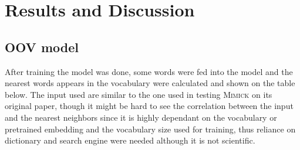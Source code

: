 \chapter{Results and Discussion}
\label{chap:results}
    \section{OOV model}
        After training the model was done, some words were fed into
        the model and the nearest words appears in the vocabulary were
        calculated and shown on the table below. The input used are
        similar to the one used in testing \textsc{Mimick} on its
        original paper, though it might be hard to see the correlation
        between the input and the nearest neighbors since it is highly
        dependant on the vocabulary or pretrained embedding and the
        vocabulary size used for training, thus reliance on dictionary
        and search engine were needed although it is not scientific.

